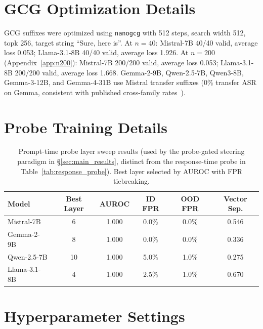 \documentclass{article}
\begin{document}



\appendix

\section{GCG Optimization Details}
\label{app:gcg}

GCG suffixes were optimized using \texttt{nanogcg} with 512 steps, search width 512, topk 256, target string ``Sure, here is''. At $n=40$: Mistral-7B 40/40 valid, average loss 0.053; Llama-3.1-8B 40/40 valid, average loss 1.926. At $n=200$ (Appendix~\ref{app:n200}): Mistral-7B 200/200 valid, average loss 0.053; Llama-3.1-8B 200/200 valid, average loss 1.668. Gemma-2-9B, Qwen-2.5-7B, Qwen3-8B, Gemma-3-12B, and Gemma-4-31B use Mistral transfer suffixes (0\% transfer ASR on Gemma, consistent with published cross-family rates~\citep{zou2023universal}).

\section{Probe Training Details}
\label{app:probes}

\begin{table}[H]
\caption{Prompt-time probe layer sweep results (used by the probe-gated steering paradigm in \S\ref{sec:main_results}, distinct from the response-time probe in Table~\ref{tab:response_probe}). Best layer selected by AUROC with FPR tiebreaking.}
\centering
\begin{tabular}{lccccc}
\toprule
\textbf{Model} & \textbf{Best Layer} & \textbf{AUROC} & \textbf{ID FPR} & \textbf{OOD FPR} & \textbf{Vector Sep.} \\
\midrule
Mistral-7B   & 6  & 1.000 & 0.0\% & 0.0\% & 0.546 \\
Gemma-2-9B   & 8  & 1.000 & 0.0\% & 0.0\% & 0.336 \\
Qwen-2.5-7B  & 10 & 1.000 & 5.0\% & 1.0\% & 0.275 \\
Llama-3.1-8B & 4  & 1.000 & 2.5\% & 1.0\% & 0.670 \\
\bottomrule
\end{tabular}
\end{table}

\section{Hyperparameter Settings}
\label{app:hyperparams}
\end{document}
